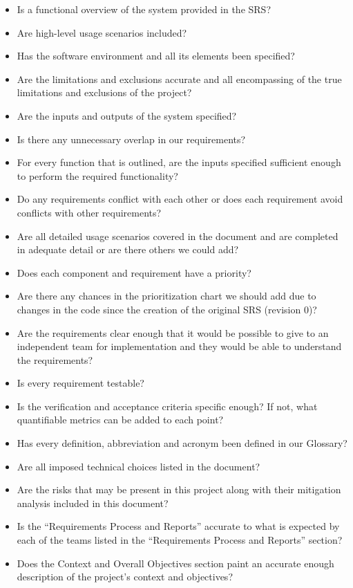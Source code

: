 \documentclass[12pt, titlepage]{article}
\begin{document}
  \begin{itemize}
  \item Is a functional overview of the system provided in the SRS?
  \item Are high-level usage scenarios included?
  \item Has the software environment and all its elements been specified?
  \item Are the limitations and exclusions accurate and all encompassing of the true limitations and exclusions of the project?
  \item Are the inputs and outputs of the system specified?
  \item Is there any unnecessary overlap in our requirements?
  \item For every function that is outlined, are the inputs specified sufficient enough to perform the required functionality?
  \item Do any requirements conflict with each other or does each requirement avoid conflicts with other requirements?
  \item Are all detailed usage scenarios covered in the document and are completed in adequate detail or are there others we could add?
  \item Does each component and requirement have a priority?
  \item Are there any chances in the prioritization chart we should add due to changes in the code since the creation of the original SRS (revision 0)?
  \item Are the requirements clear enough that it would be possible to give to an independent team for implementation and they would be able to understand the requirements?
  \item Is every requirement testable?
  \item Is the verification and acceptance criteria specific enough? If not, what quantifiable metrics can be added to each point?
  \item Has every definition, abbreviation and acronym been defined in our Glossary?
  \item Are all imposed technical choices listed in the document?
  \item Are the risks that may be present in this project along with their mitigation analysis included in this document?
  \item Is the “Requirements Process and Reports” accurate to what is expected by each of the teams listed in the “Requirements Process and Reports” section?
  \item Does the Context and Overall Objectives section paint an accurate enough description of the project's context and objectives?\\
  \end{itemize}
  
\end{document}
